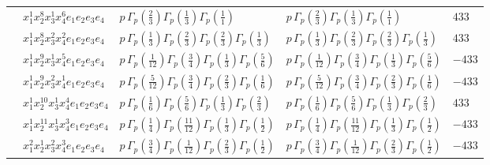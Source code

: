 \documentclass[11pt]{article}
\begin{document}
\begin{table}[ht]
{\begin{tabular}{@{}lllll@{}}
 & $x_{1}^{1} x_{2}^{8} x_{3}^{1} x_{4}^{6}  e_{1} e_{2} e_{3} e_{4}$ & $p \, \Gamma_p \left( \frac{2}{3} \right) \Gamma_p \left( \frac{1}{3} \right) \Gamma_p \left( \frac{1}{1} \right)$ & $p \, \Gamma_p \left( \frac{2}{3} \right) \Gamma_p \left( \frac{1}{3} \right) \Gamma_p \left( \frac{1}{1} \right)$ & $433$ \\
 & $x_{1}^{1} x_{2}^{8} x_{3}^{2} x_{4}^{2}  e_{1} e_{2} e_{3} e_{4}$ & $p \, \Gamma_p \left( \frac{1}{3} \right) \Gamma_p \left( \frac{2}{3} \right) \Gamma_p \left( \frac{2}{3} \right) \Gamma_p \left( \frac{1}{3} \right)$ & $p \, \Gamma_p \left( \frac{1}{3} \right) \Gamma_p \left( \frac{2}{3} \right) \Gamma_p \left( \frac{2}{3} \right) \Gamma_p \left( \frac{1}{3} \right)$ & $433$ \\
 & $x_{1}^{1} x_{2}^{9} x_{3}^{1} x_{4}^{5}  e_{1} e_{2} e_{3} e_{4}$ & $p \, \Gamma_p \left( \frac{1}{12} \right) \Gamma_p \left( \frac{3}{4} \right) \Gamma_p \left( \frac{1}{3} \right) \Gamma_p \left( \frac{5}{6} \right)$ & $p \, \Gamma_p \left( \frac{1}{12} \right) \Gamma_p \left( \frac{3}{4} \right) \Gamma_p \left( \frac{1}{3} \right) \Gamma_p \left( \frac{5}{6} \right)$ & $-433$ \\
 & $x_{1}^{1} x_{2}^{9} x_{3}^{2} x_{4}^{1}  e_{1} e_{2} e_{3} e_{4}$ & $p \, \Gamma_p \left( \frac{5}{12} \right) \Gamma_p \left( \frac{3}{4} \right) \Gamma_p \left( \frac{2}{3} \right) \Gamma_p \left( \frac{1}{6} \right)$ & $p \, \Gamma_p \left( \frac{5}{12} \right) \Gamma_p \left( \frac{3}{4} \right) \Gamma_p \left( \frac{2}{3} \right) \Gamma_p \left( \frac{1}{6} \right)$ & $-433$ \\
 & $x_{1}^{1} x_{2}^{10} x_{3}^{1} x_{4}^{4}  e_{1} e_{2} e_{3} e_{4}$ & $p \, \Gamma_p \left( \frac{1}{6} \right) \Gamma_p \left( \frac{5}{6} \right) \Gamma_p \left( \frac{1}{3} \right) \Gamma_p \left( \frac{2}{3} \right)$ & $p \, \Gamma_p \left( \frac{1}{6} \right) \Gamma_p \left( \frac{5}{6} \right) \Gamma_p \left( \frac{1}{3} \right) \Gamma_p \left( \frac{2}{3} \right)$ & $433$ \\
 & $x_{1}^{1} x_{2}^{11} x_{3}^{1} x_{4}^{3}  e_{1} e_{2} e_{3} e_{4}$ & $p \, \Gamma_p \left( \frac{1}{4} \right) \Gamma_p \left( \frac{11}{12} \right) \Gamma_p \left( \frac{1}{3} \right) \Gamma_p \left( \frac{1}{2} \right)$ & $p \, \Gamma_p \left( \frac{1}{4} \right) \Gamma_p \left( \frac{11}{12} \right) \Gamma_p \left( \frac{1}{3} \right) \Gamma_p \left( \frac{1}{2} \right)$ & $-433$ \\
 & $x_{1}^{2} x_{2}^{1} x_{3}^{2} x_{4}^{3}  e_{1} e_{2} e_{3} e_{4}$ & $p \, \Gamma_p \left( \frac{3}{4} \right) \Gamma_p \left( \frac{1}{12} \right) \Gamma_p \left( \frac{2}{3} \right) \Gamma_p \left( \frac{1}{2} \right)$ & $p \, \Gamma_p \left( \frac{3}{4} \right) \Gamma_p \left( \frac{1}{12} \right) \Gamma_p \left( \frac{2}{3} \right) \Gamma_p \left( \frac{1}{2} \right)$ & $-433$ \\

\end{tabular}}
\end{table}
\end{document}
